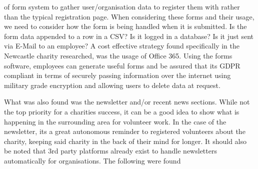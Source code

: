 \documentclass[11pt,a4paper]{article}
\begin{document}
 of form system to gather user/organisation data to register them with rather than the typical registration page. When considering these forms and their usage, we need to consider how the form is being handled when it is submitted. Is the form data appended to a row in a CSV? Is it logged in a database? Is it just sent via E-Mail to an employee? A cost effective strategy found specifically in the Newcastle charity researched, was the usage of Office 365. Using the forms software, employees can generate useful forms and be assured that its GDPR compliant in terms of securely passing information over the internet using military grade encryption and allowing users to delete data at request. 

\hfill \break
What was also found was the newsletter and/or recent news sections. While not the top priority for a charities success, it can be a good idea to show what is happening in the surrounding area for volunteer work. In the case of the newsletter, its a great autonomous reminder to registered volunteers about the charity, keeping said charity in the back of their mind for longer. It should also be noted that 3rd party platforms already exist to handle newsletters automatically for organisations. The following were found 
\end{document}
